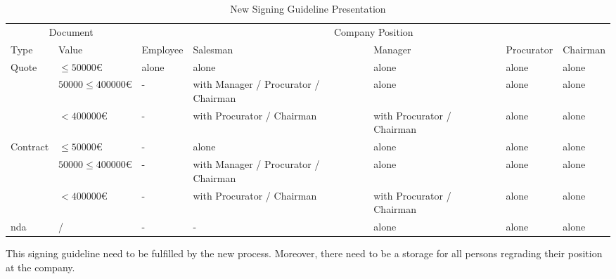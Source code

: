 \begin{table}[h!]
	\begin{tabular}{|p{1.5cm}|p{2cm}|p{2cm}|p{2cm}|p{2cm}|p{2cm}|p{2cm}|} \hline
		\multicolumn{2}{|c|}{Document} & \multicolumn{5}{c|}{Company Position}\\ 
		Type & Value & Employee & Salesman & Manager & Procurator & Chairman \\ \hline
		\multirow{3}{1.5cm}{Quote} & $ \leq 50 000 \euro$ & alone & alone & alone & alone & alone \\ \cline{2-7}
							 & $ 50 000 \leq 400 000 \euro$ & - & with Manager / Procurator / Chairman & alone & alone & alone \\ \cline{2-7}
							 & $ < 400 000 \euro$ & - & with Procurator / Chairman & with Procurator / Chairman & alone & alone \\ \hline
		\multirow{3}{1.5cm}{Contract} & $ \leq 50 000 \euro$ & - & alone & alone & alone & alone \\ \cline{2-7}
									& $ 50 000 \leq 400 000 \euro$ & - & with Manager / Procurator / Chairman & alone & alone & alone \\ \cline{2-7}
									& $ < 400 000 \euro$ & - & with Procurator / Chairman
									& with Procurator / Chairman & alone & alone \\ \hline
		\Gls{nda} & / & - & - & alone & alone & alone \\ \hline
	\end{tabular}
	\centering
	\caption{New Signing Guideline Presentation}
	\label{tab:newSigningGuideline}
\end{table}

This signing guideline need to be fulfilled by the new process. Moreover, there need to be a storage for all persons regrading their position at the company. 
